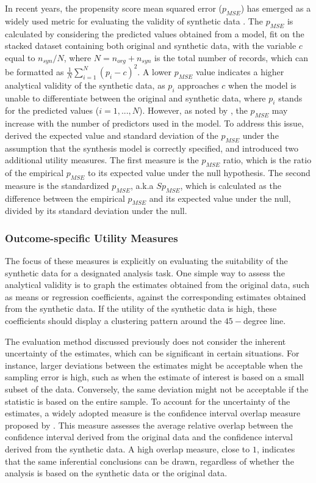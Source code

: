In recent years, the propensity score mean squared error ($p_{MSE}$) has emerged as a widely used metric for evaluating the validity of synthetic data \citep{woo2009global,snoke2018general}. The $p_{MSE}$ is calculated by considering the predicted values obtained from a model, fit on the stacked dataset containing both original and synthetic data, with the variable $c$ equal to $n_{syn}/N$, where $N = n_{org} + n_{syn}$ is the total number of records, which can be formatted as $\frac{1}{N} \sum_{i=1}^{N}(p_i-c)^2$. A lower $p_{MSE}$ value indicates a higher analytical validity of the synthetic data, as $p_i$ approaches $c$ when the model is unable to differentiate between the original and synthetic data, where $p_{i}$ stands for the predicted values ($i=1,...,N$). However, as noted by \citet{woo2009global}, the $p_{MSE}$ may increase with the number of predictors used in the model. To address this issue, \citet{snoke2018general} derived the expected value and standard deviation of the $p_{MSE}$ under the assumption that the synthesis model is correctly specified, and introduced two additional utility measures. The first measure is the $p_{MSE}$ ratio, which is the ratio of the empirical $p_{MSE}$ to its expected value under the null hypothesis. The second measure is the standardized $p_{MSE}$, a.k.a $Sp_{MSE}$, which is calculated as the difference between the empirical $p_{MSE}$ and its expected value under the null, divided by its standard deviation under the null.



\subsubsection{Outcome-specific Utility Measures}
\label{subsubsec:outcome}
The focus of these measures is explicitly on evaluating the suitability of the synthetic data for a designated analysis task. One simple way to assess the analytical validity is to graph the estimates obtained from the original data, such as means or regression coefficients, against the corresponding estimates obtained from the synthetic data. If the utility of the synthetic data is high, these coefficients should display a clustering pattern around the $45-$degree line.

The evaluation method discussed previously does not consider the inherent uncertainty of the estimates, which can be significant in certain situations. For instance, larger deviations between the estimates might be acceptable when the sampling error is high, such as when the estimate of interest is based on a small subset of the data. Conversely, the same deviation might not be acceptable if the statistic is based on the entire sample. To account for the uncertainty of the estimates, a widely adopted measure is the confidence interval overlap measure proposed by \citet{karr2006framework}. This measure assesses the average relative overlap between the confidence interval derived from the original data and the confidence interval derived from the synthetic data. A high overlap measure, close to $1$, indicates that the same inferential conclusions can be drawn, regardless of whether the analysis is based on the synthetic data or the original data.

